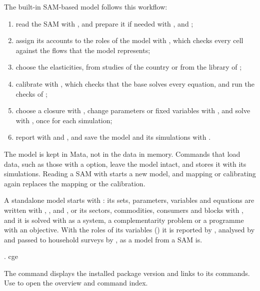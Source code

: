 
The built-in SAM-based model follows this workflow:
\begin{enumerate}
\item read the SAM with , and prepare it if needed with
,  and ;
\item assign its accounts to the roles of the model with ,
which checks every cell against the flows that the model represents;
\item choose the elasticities, from studies of the country or from the library
of ;
\item calibrate with , which checks that the base solves
every equation, and run the checks of ;
\item choose a closure with , change parameters or fixed
variables with , and solve with , once for
each simulation;
\item report with  and , and save the
model and its simulations with .
\end{enumerate}
The model is kept in Mata, not in the data in memory. Commands that load data,
such as those with a  option, leave the model intact, and
 stores it with its simulations. Reading a SAM with
 starts a new model, and mapping or calibrating again replaces
the mapping or the calibration.

A standalone model starts with : its sets, parameters,
variables and equations are written with ,
,  and , or
its sectors, commodities, consumers and blocks with , and
it is solved with  as a system, a complementarity problem
or a programme with an objective. With the roles of its variables
() it is reported by , analysed by
 and passed to household surveys by
, as a model from a SAM is.


\begin{stcode}
. cge
\end{stcode}
The command displays the installed package version and links to its commands.
Use  to open the overview and command index.

